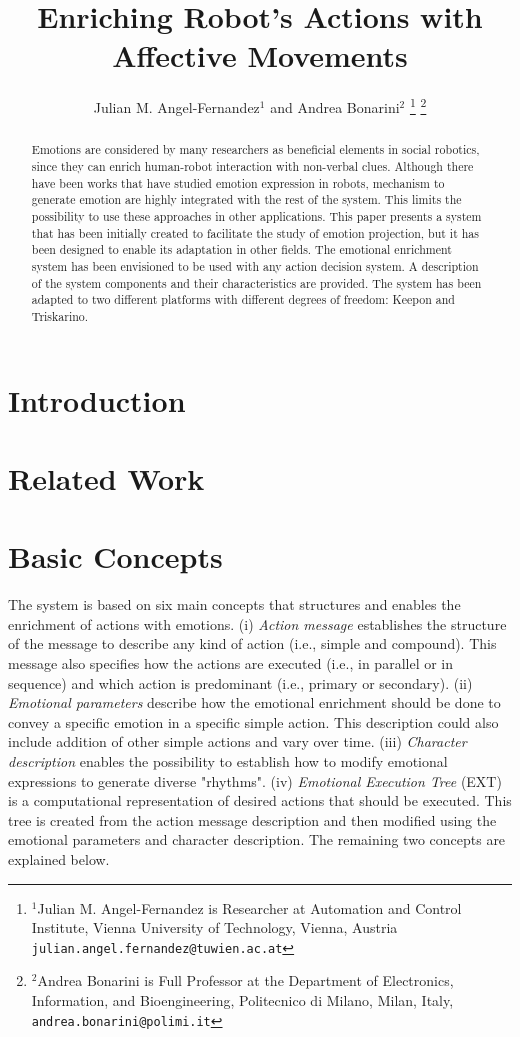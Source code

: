 \documentclass[letterpaper, 10 pt, conference]{ieeeconf}  %
\title{\LARGE \bf
Enriching Robot's Actions with Affective Movements
}
\author{Julian M. Angel-Fernandez$^{1}$ and Andrea Bonarini$^{2}$%
\thanks{$^{1}$Julian M. Angel-Fernandez is Researcher at Automation and Control Institute, Vienna University of Technology, Vienna, Austria
        {\tt\small julian.angel.fernandez@tuwien.ac.at}}%
\thanks{$^{2}$Andrea Bonarini is Full Professor at the Department of Electronics, Information, and Bioengineering, Politecnico di Milano, Milan, Italy,
        {\tt\small andrea.bonarini@polimi.it}}%
}
\begin{document}
\maketitle
\thispagestyle{empty}
\pagestyle{empty}


\begin{abstract}
Emotions are considered by many researchers as beneficial elements in social robotics, since they can enrich human-robot interaction with non-verbal clues. Although there have been works that have studied emotion expression in robots, mechanism to generate emotion are highly integrated with the rest of the system. This limits the possibility to use these approaches in other applications. This paper presents a system that has been initially created to facilitate the study of emotion projection, but it has been designed to enable its adaptation in other fields. The emotional enrichment system has been envisioned to be used with any action decision system. A description of the system components and their characteristics are provided. The system has been adapted to two different platforms with different degrees of freedom: Keepon and Triskarino. 
\end{abstract}

\section{Introduction}

\section{Related Work}
\label{sec:related_work}

\section{Basic Concepts}
\label{sec:concepts}
The system is based on six main concepts that structures and enables the enrichment of actions with emotions. (i) \textit{Action message} establishes the structure of the message to describe any kind of action (i.e., simple and compound). This message also specifies how the actions are executed (i.e., in parallel or in sequence) and which action is predominant (i.e., primary or secondary). (ii) \textit{Emotional parameters} describe how the emotional enrichment should be done to convey a specific emotion in a specific simple action. This description could also include addition of other simple actions and vary over time. (iii) \textit{Character description} enables the possibility to establish how to modify emotional expressions to generate diverse "rhythms". (iv) \textit{Emotional Execution Tree} (EXT) is a computational representation of desired actions that should be executed. This tree is created from the action message description and then modified using the emotional parameters and character description. The remaining two concepts are explained below.
\end{document}
